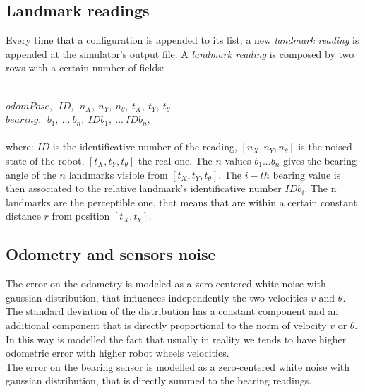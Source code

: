 \vspace{1 cm}
\subsection{Landmark readings}
Every time that a configuration is appended to its list, a new \textit{landmark reading} is appended at the simulator's output file.
A \textit{landmark reading} is composed by two rows with a certain number of fields:\\\

$
odomPose, ~~ ID, ~~ n_X, ~ n_Y, ~  n_{\theta}, ~  t_X, ~  t_Y, ~ t_{\theta}
$\\

$
bearing, ~~ b_1, ~ ... ~ b_n, ~ IDb_1, ~ ... ~ IDb_n, 
$\\ \\
where:
\textit{$ID$} is the identificative number of the reading, $[n_X, n_Y, n_{\theta}]$ is the noised state of the robot, $[t_X, t_Y, t_{\theta}]$ the real one.
The $n$ values $ b_1 ... b_n$ gives the bearing angle of the $n$ landmarks visible from $[t_X, t_Y, t_{\theta}]$. The $i-th$ bearing value is then associated to 
the relative landmark's identificative number $IDb_i$.
The n landmarks are the perceptible one, that means that are within a certain constant distance $r$ from position $[t_X, t_Y ]$.


\subsection{Odometry and sensors noise}
The error on the odometry is modeled as a zero-centered white noise with gaussian distribution, that influences independently the two velocities $v$ and $\theta$.
The standard deviation of the distribution has a constant component and an additional component that is directly proportional to the norm of velocity $v$ or $\theta$.
In this way is modelled the fact that usually in reality we tends to have higher odometric error with higher robot wheels velocities.
\\
The error on the bearing sensor is modelled as a zero-centered white noise with gaussian distribution, that is directly summed to the bearing readings.\\